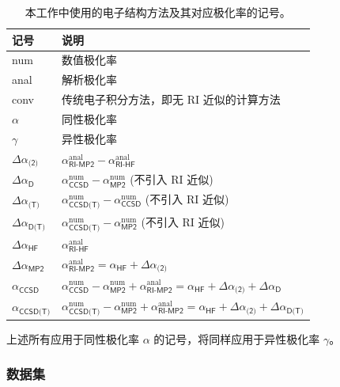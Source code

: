 \begin{table}[ht]
    \centering
    \caption{本工作中使用的电子结构方法及其对应极化率的记号。}
    \label{tab.5.1}
    \begin{tabular}{ll}
    \hline
    记号 & 说明 \\
    \hline
    num & 数值极化率 \\
    anal & 解析极化率 \\
    conv & 传统电子积分方法，即无 RI 近似的计算方法 \\
    $\alpha$ & 同性极化率 \\
    $\gamma$ & 异性极化率 \\
    $\Delta \alpha_\textsf{(2)}$ & $\alpha^\text{anal}_\textsf{RI-MP2} - \alpha^\text{anal}_\textsf{RI-HF}$ \\
    $\Delta \alpha_\textsf{D}$ & $\alpha^\text{num}_\textsf{CCSD} - \alpha^\text{num}_\textsf{MP2}$ (不引入 RI 近似) \\
    $\Delta \alpha_\textsf{(T)}$ & $\alpha^\text{num}_\textsf{CCSD(T)} - \alpha^\text{num}_\textsf{CCSD}$ (不引入 RI 近似) \\
    $\Delta \alpha_\textsf{D(T)}$ & $\alpha^\text{num}_\textsf{CCSD(T)} - \alpha^\text{num}_\textsf{MP2}$ (不引入 RI 近似) \\
    $\Delta \alpha_\textsf{HF}$ & $\alpha^\text{anal}_\textsf{RI-HF}$ \\
    $\Delta \alpha_\textsf{MP2}$ & $\alpha^\text{anal}_\textsf{RI-MP2} = \alpha_\textsf{HF} + \Delta \alpha_\textsf{(2)}$ \\
    $\alpha_\textsf{CCSD}$ & $\alpha^\text{num}_\textsf{CCSD} - \alpha^\text{num}_\textsf{MP2} + \alpha^\text{anal}_\textsf{RI-MP2} = \alpha_\textsf{HF} + \Delta \alpha_\textsf{(2)} + \Delta \alpha_\textsf{D}$ \\
    $\alpha_\textsf{CCSD(T)}$ & $\alpha^\text{num}_\textsf{CCSD(T)} - \alpha^\text{num}_\textsf{MP2} + \alpha^\text{anal}_\textsf{RI-MP2} = \alpha_\textsf{HF} + \Delta \alpha_\textsf{(2)} + \Delta \alpha_\textsf{D(T)}$ \\
    \hline
    \end{tabular}
  
    \raggedright
    \par{} 上述所有应用于同性极化率 $\alpha$ 的记号，将同样应用于异性极化率 $\gamma$。
\end{table}

\subsubsection{数据集}


